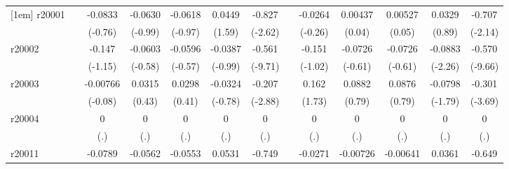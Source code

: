 {\begin{tabular}{l*{12}{c}}
[1em]
r20001      &                     &     -0.0833         &     -0.0630         &     -0.0618         &      0.0449         &      -0.827\sym{*}  &                     &     -0.0264         &     0.00437         &     0.00527         &      0.0329         &      -0.707\sym{*}  \\
            &                     &     (-0.76)         &     (-0.99)         &     (-0.97)         &      (1.59)         &     (-2.62)         &                     &     (-0.26)         &      (0.04)         &      (0.05)         &      (0.89)         &     (-2.14)         \\
[1em]
r20002      &                     &      -0.147         &     -0.0603         &     -0.0596         &     -0.0387         &      -0.561\sym{***}&                     &      -0.151         &     -0.0726         &     -0.0726         &     -0.0883\sym{*}  &      -0.570\sym{***}\\
            &                     &     (-1.15)         &     (-0.58)         &     (-0.57)         &     (-0.99)         &     (-9.71)         &                     &     (-1.02)         &     (-0.61)         &     (-0.61)         &     (-2.26)         &     (-9.66)         \\
[1em]
r20003      &                     &    -0.00766         &      0.0315         &      0.0298         &     -0.0324         &      -0.207\sym{**} &                     &       0.162         &      0.0882         &      0.0876         &     -0.0798         &      -0.301\sym{***}\\
            &                     &     (-0.08)         &      (0.43)         &      (0.41)         &     (-0.78)         &     (-2.88)         &                     &      (1.73)         &      (0.79)         &      (0.79)         &     (-1.79)         &     (-3.69)         \\
[1em]
r20004      &                     &           0         &           0         &           0         &           0         &           0         &                     &           0         &           0         &           0         &           0         &           0         \\
            &                     &         (.)         &         (.)         &         (.)         &         (.)         &         (.)         &                     &         (.)         &         (.)         &         (.)         &         (.)         &         (.)         \\
[1em]
r20011      &                     &     -0.0789         &     -0.0562         &     -0.0553         &      0.0531\sym{*}  &      -0.749\sym{*}  &                     &     -0.0271         &    -0.00726         &    -0.00641         &      0.0361         &      -0.649\sym{*}  \\

\end{tabular}}
